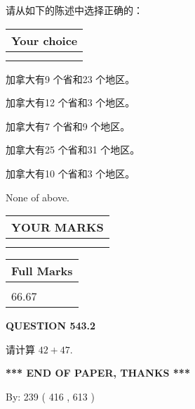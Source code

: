 \documentclass{ctexart}
\begin{document}
  
请从如下的陈述中选择正确的：
  
  
\noindent\hspace{3.0in} \begin{tabular}{|l|}
\hline
Your choice \\
\hline
 \\ 
 \\ 
\hline
\end{tabular}
  
  
 
 
加拿大有9 个省和23 个地区。
 
 
加拿大有12 个省和3 个地区。
 
 
加拿大有7 个省和9 个地区。
 
 
加拿大有25 个省和31 个地区。
 
 
加拿大有10 个省和3 个地区。
 
 
 None of above.
 
 
  
\vspace{0.2in}
  
\noindent\begin{tabular}{|l|}
\hline
 YOUR MARKS  \\
\hline
 \\ 
 \\ 
\hline
\end{tabular}
\hspace{0.05in} \begin{tabular}{|l|}
\hline
 Full Marks  \\
\hline
 \\ 
66.67 \\
\hline
\end{tabular}
{\textbf{\Large{QUESTION
543.2 
}}}
  
  
 
请计算 $ %
42 +  %
47 $.
 

 

 
   
   
 \vspace{0.2in}
 
   
   
   
   
\vspace{1.0in} 
{\textbf{\large{ *** END OF PAPER, THANKS *** }}} 
   
   
\hspace{1.0in} By: 
 239 ( 416 ,  613 )
   
\end{document}
